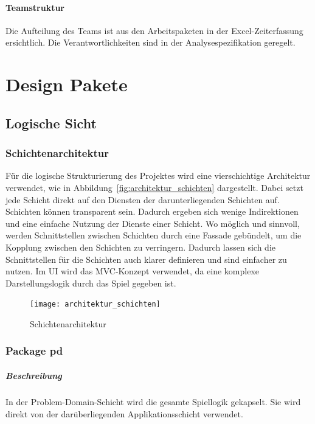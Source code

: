 \documentclass[12pt,halfparskip]{scrartcl}
\begin{document}
\paragraph{Teamstruktur}\label{ssub:teamstruktur} %
Die Aufteilung des Teams ist aus den Arbeitspaketen in der Excel-Zeiterfassung ersichtlich. Die Verantwortlichkeiten sind in der Analysespezifikation geregelt.

\clearpage
\section{Design Pakete} %
\label{design_pakete}

\subsection{Logische Sicht} %
\label{sub:logische_sicht}


\subsubsection{Schichtenarchitektur} %
\label{sub:schichtenarchitektur}
Für die logische Strukturierung des Projektes wird eine vierschichtige Architektur verwendet, wie in Abbildung~\vref{fig:architektur_schichten} dargestellt. Dabei setzt jede Schicht direkt auf den Diensten der darunterliegenden Schichten auf. Schichten können transparent sein. Dadurch ergeben sich wenige Indirektionen und eine einfache Nutzung der Dienste einer Schicht. Wo möglich und sinnvoll, werden Schnittstellen zwischen Schichten durch eine Fassade gebündelt, um die Kopplung zwischen den Schichten zu verringern. Dadurch lassen sich die Schnittstellen für die Schichten auch klarer definieren und sind einfacher zu nutzen. Im UI wird das MVC-Konzept verwendet, da eine komplexe Darstellungslogik durch das Spiel gegeben ist.
\begin{figure}
	\centering
	\texttt{[image: architektur\_schichten]}
	\caption{Schichtenarchitektur}
	\label{fig:architektur_schichten}
\end{figure}

\clearpage

\subsubsection{Package pd} %
\label{ssub:package_pd}
\subparagraph{Beschreibung}
In der Problem-Domain-Schicht wird die gesamte Spiellogik gekapselt. Sie wird direkt von der darüberliegenden Applikationsschicht verwendet.
\end{document}
